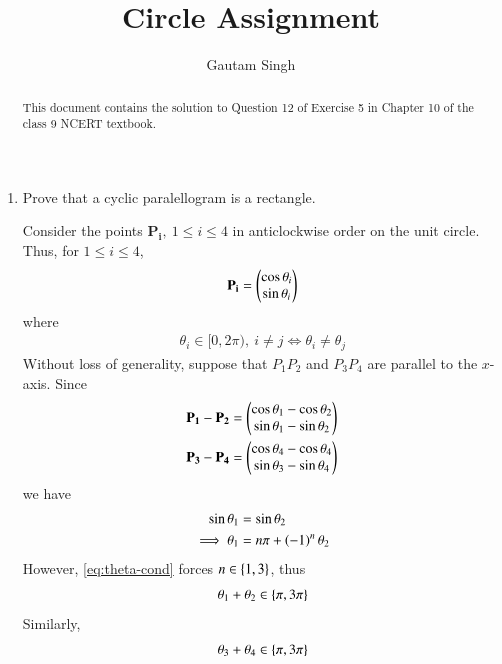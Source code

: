 \documentclass[journal,12pt,twocolumn]{IEEEtran}
\renewcommand{\vec}[1]{\boldsymbol{\mathbf{#1}}}
\begin{document}
\vspace{3cm}
\title{Circle Assignment}
\author{Gautam Singh}
\maketitle
\bigskip

\begin{abstract}
    This document contains the solution to Question 12 of 
    Exercise 5 in Chapter 10 of the class 9 NCERT textbook.
\end{abstract}

\begin{enumerate}
    \item Prove that a cyclic paralellogram is a rectangle.

    \solution Consider the points $\vec{P_i},\ 1 \le i \le 4$ in anticlockwise 
    order on the unit circle. Thus, for $1 \le i \le 4$,
    \begin{align}
        \vec{P_i} = \myvec{\cos\theta_i\\\sin\theta_i} 
        \label{eq:circ-point}
    \end{align}
    where 
    \begin{align}
        \theta_i \in [0,2\pi),\ i \neq j \iff \theta_i \neq \theta_j
        \label{eq:theta-cond}
    \end{align}
    Without loss of generality, suppose that $P_1P_2$ and $P_3P_4$ are parallel 
    to the $x$-axis. Since
    \begin{align}
        \vec{P_1}-\vec{P_2} &= \myvec{\cos\theta_1-\cos\theta_2\\\sin\theta_1-\sin\theta_2} \\
        \vec{P_3}-\vec{P_4} &= \myvec{\cos\theta_4-\cos\theta_4\\\sin\theta_3-\sin\theta_4}
    \end{align}
    we have
    \begin{align}
        \sin\theta_1&=\sin\theta_2 \\
        \implies \theta_1&=n\pi+\left(-1\right)^n\theta_2
        \label{eq:x-par}
    \end{align}
    However, \eqref{eq:theta-cond} forces $n \in \left\{1,3\right\}$, thus
    \begin{align}
        \theta_1+\theta_2 \in \left\{\pi,3\pi\right\}
        \label{eq:theta-12}
    \end{align}
    Similarly,
    \begin{align}
        \theta_3+\theta_4 \in \cbrak{\pi,3\pi}
        \label{eq:theta-34}

\end{align}
\end{enumerate}
\end{document}
